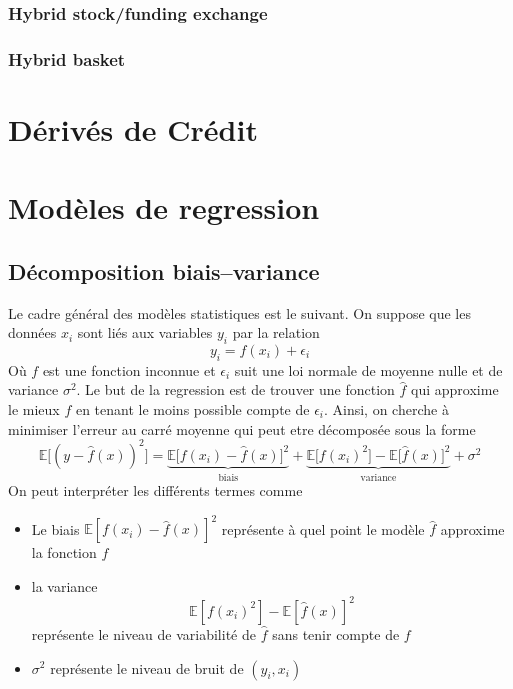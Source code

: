 \documentclass[a4paper]{article}
\begin{document}
\subsubsection{Hybrid stock/funding exchange}
\subsubsection{Hybrid basket}

\section{Dérivés de Crédit}

\section{Modèles de regression}
 \subsection{Décomposition biais--variance}
 Le cadre général des modèles statistiques est le suivant. On suppose que les données $x_i$ sont liés aux variables $y_i$ par la relation
 \begin{equation}
     y_i = f(x_i) + \epsilon_i
 \end{equation}
 Où $f$ est une fonction inconnue et $\epsilon_i$  suit une loi normale de moyenne nulle et de variance $\sigma^2$. Le but de la regression est de trouver une fonction $\hat{f}$ qui approxime le mieux $f$ en tenant le moins possible compte de $\epsilon_i$. Ainsi, on cherche à minimiser l'erreur au carré moyenne qui peut etre décomposée sous la forme
 \begin{equation}
     \mathbb{E}\bigg[(y-\hat{f}(x))^2\bigg] = \underbrace{\mathbb{E}\bigg[f(x_i)-\hat{f}(x) \bigg]^2}_{\text{biais}} +
     \underbrace{\mathbb{E}\bigg[f(x_i)^2\bigg]-\mathbb{E}\bigg[\hat{f}(x)\bigg]^2}_{\text{variance}} +
     \sigma^2
 \end{equation}
 On peut interpréter les différents termes comme
 \begin{itemize}
     \item Le biais $\mathbb{E}[f(x_i)-\hat{f}(x) ]^2$ représente à quel point le modèle $\hat{f}$ approxime la fonction $f$
     \item la variance \[ \mathbb{E}[f(x_i)^2]-\mathbb{E}[\hat{f}(x)]^2\]représente le niveau de variabilité de $\hat{f}$ sans tenir compte de $f$
     \item $\sigma^2$ représente le niveau de bruit de $(y_i, x_i)$
 \end{itemize}
\end{document}
